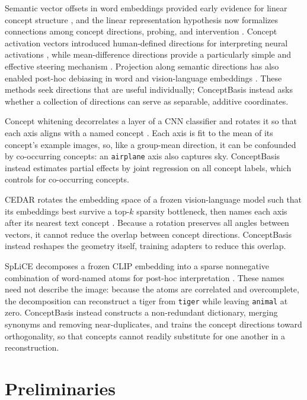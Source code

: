 \documentclass[mlmain,onecolumn]{jmlr}
\begin{document}
Semantic vector offsets in word embeddings provided early evidence for linear concept structure \citep{mikolov2013linguistic}, and the linear representation hypothesis now formalizes connections among concept directions, probing, and intervention \citep{park2024linear}. Concept activation vectors introduced human-defined directions for interpreting neural activations \citep{kim2018tcav}, while mean-difference directions provide a particularly simple and effective steering mechanism \citep{rimsky2024steering}. Projection along semantic directions has also enabled post-hoc debiasing in word and vision-language embeddings \citep{bolukbasi2016debiasing,chuang2023debiasing}. These methods seek directions that are useful individually; ConceptBasis instead asks whether a collection of directions can serve as separable, additive coordinates.

Concept whitening decorrelates a layer of a CNN classifier and rotates it so that each axis aligns with a named concept \citep{chen2020conceptwhitening}. Each axis is fit to the mean of its concept's example images, so, like a group-mean direction, it can be confounded by co-occurring concepts: an \texttt{airplane} axis also captures sky. ConceptBasis instead estimates partial effects by joint regression on all concept labels, which controls for co-occurring concepts.

CEDAR rotates the embedding space of a frozen vision-language model such that its embeddings best survive a top-$k$ sparsity bottleneck, then names each axis after its nearest text concept \citep{kubaty2026cedar}. Because a rotation preserves all angles between vectors, it cannot reduce the overlap between concept directions. ConceptBasis instead reshapes the geometry itself, training adapters to reduce this overlap.

SpLiCE decomposes a frozen CLIP embedding into a sparse nonnegative combination of word-named atoms for post-hoc interpretation \citep{bhalla2024splice}. These names need not describe the image: because the atoms are correlated and overcomplete, the decomposition can reconstruct a tiger from \texttt{tiger} while leaving \texttt{animal} at zero. ConceptBasis instead constructs a non-redundant dictionary, merging synonyms and removing near-duplicates, and trains the concept directions toward orthogonality, so that concepts cannot readily substitute for one another in a reconstruction.

\section{Preliminaries}
\end{document}
